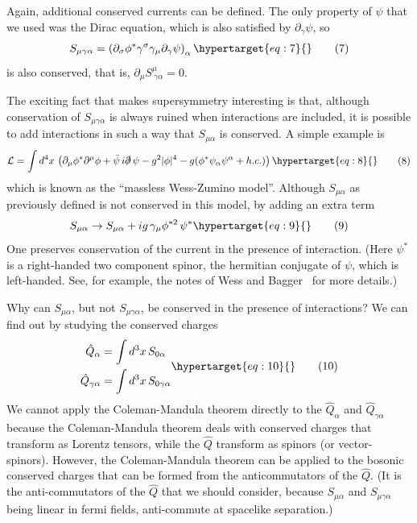 \documentclass[11pt,a4paper]{article}
\newcommand{\eqtarget}[1]{\hypertarget{eq:#1}{\mathstrut}\tag{#1}}
\begin{document}
Again, additional conserved currents can be defined. The only
property of $\psi$ that we used was the Dirac equation, which is also
satisfied by $\partial_\gamma \psi$, so
\begin{equation}
S_{\mu\gamma\alpha} = \left(\partial_\sigma \phi^* \gamma^\sigma \gamma_\mu \partial_\gamma \psi\right)_\alpha
\eqtarget{7}
\end{equation}
is also conserved, that is, $\partial_\mu S^\mu_{\ \gamma\alpha} = 0$.

The exciting fact that makes supersymmetry interesting is that,
although conservation of $S_{\mu\gamma\alpha}$ is always ruined when interactions are
included, it is possible to add interactions in such a way that $S_{\mu\alpha}$
is conserved. A simple example is
\begin{equation}
\mathcal{L} = \int d^4x\, \left(\partial_\mu \phi^* \partial^\mu \phi + \bar\psi\, i \slashed{\partial}\, \psi - g^2 |\phi|^4 - g(\phi^* \psi_\alpha \psi^\alpha + h.c.)\right)
\eqtarget{8}
\end{equation}
which is known as the ``massless Wess-Zumino model''. Although $S_{\mu\alpha}$
as previously defined is not conserved in this model, by adding an
extra term
\begin{equation}
S_{\mu\alpha} \rightarrow S_{\mu\alpha} + i g\, \gamma_\mu \phi^{*2}\, \psi^*
\eqtarget{9}
\end{equation}
One preserves conservation of the current in the presence of
interaction. (Here $\psi^*$ is a right-handed two component spinor, the
hermitian conjugate of $\psi$, which is left-handed. See, for example, the
notes of Wess and Bagger~\cite{ref2} for more details.)

\begingroup
\renewcommand{\thefootnote}{\fnsymbol{footnote}}
\endgroup

Why can $S_{\mu\alpha}$, but not $S_{\mu\gamma\alpha}$, be conserved in the presence of
interactions? We can find out by studying the conserved charges
\begin{equation}
\begin{aligned}
\hat Q_\alpha &= \int d^3x\, S_{0\alpha} \\
\hat Q_{\gamma\alpha} &= \int d^3x\, S_{0\gamma\alpha}
\end{aligned}
\eqtarget{10}
\end{equation}
We cannot apply the Coleman-Mandula theorem directly to the $\hat Q_\alpha$ and
$\hat Q_{\gamma\alpha}$ because the Coleman-Mandula theorem deals with conserved charges
that transform as Lorentz tensors, while the $\hat Q$ transform as spinors
(or vector-spinors). However, the Coleman-Mandula theorem can be
applied to the bosonic conserved charges that can be formed from the
anticommutators of the $\hat Q$. (It is the anti-commutators of the $\hat Q$ that
we should consider, because $S_{\mu\alpha}$ and $S_{\mu\gamma\alpha}$ being linear in fermi
fields, anti-commute at spacelike separation.)
\end{document}
